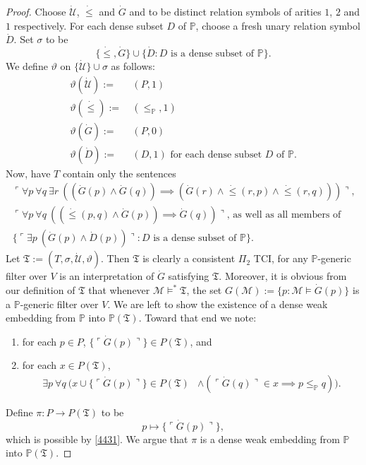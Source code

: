 \documentclass[12pt, twoside]{memoir}
\numberwithin{equation}{section}
\theoremstyle{definition}
\theoremstyle{remark}
\theoremstyle{definition}
\theoremstyle{definition}
\theoremstyle{definition}
\theoremstyle{remark}
\begin{document}
\begin{proof}
Choose $\dot{\mathcal{U}}$, $\dot{\leq}$ and $\dot{G}$ and to be distinct relation symbols of arities $1$, $2$ and $1$ respectively. For each dense subset $D$ of $\mathbb{P}$, choose a fresh unary relation symbol $\dot{D}$. Set $\sigma$ to be $$\{\dot{\leq}, \dot{G}\} \cup \{\dot{D} : D \text{ is a dense subset of } \mathbb{P}\} \text{.}$$ We define $\vartheta$ on $\{\dot{\mathcal{U}}\} \cup \sigma$ as follows:
\begin{align*}
    \vartheta(\dot{\mathcal{U}}) := \ & (P, 1) \\
    \vartheta(\dot{\leq}) := \ & (\leq_{\mathbb{P}}, 1) \\
    \vartheta(\dot{G}) := \ & (P, 0) \\
    \vartheta(\dot{D}) := \ & (D, 1) \text{ for each dense subset } D \text{ of } \mathbb{P} \text{.}
\end{align*}
Now, have $T$ contain only the sentences
\begin{gather*}
    \ulcorner \forall p \ \forall q \ \exists r \ ((\dot{G}(p) \wedge \dot{G}(q)) \implies (\dot{G}(r) \wedge \dot{\leq}(r, p) \wedge \dot{\leq}(r, q))) \urcorner \text{,} \\
    \ulcorner \forall p \ \forall q \ ((\dot{\leq}(p, q) \wedge \dot{G}(p)) \implies \dot{G}(q)) \urcorner \text{, as well as all members of} \\
    \{\ulcorner \exists p \ (\dot{G}(p) \wedge \dot{D}(p)) \urcorner : D \text{ is a dense subset of } \mathbb{P}\} \text{.}
\end{gather*} 
Let $\mathfrak{T} := (T, \sigma, \dot{\mathcal{U}}, \vartheta)$. Then $\mathfrak{T}$ is clearly a consistent $\Pi_2$ TCI, for any $\mathbb{P}$-generic filter over $V$ is an interpretation of $\dot{G}$ satisfying $\mathfrak{T}$. Moreover, it is obvious from our definition of $\mathfrak{T}$ that whenever $\mathcal{M} \models^* \mathfrak{T}$, the set $G(\mathcal{M}) := \{p : \mathcal{M} \models \dot{G}(p)\}$ is a $\mathbb{P}$-generic filter over $V$. We are left to show the existence of a dense weak embedding from $\mathbb{P}$ into $\mathbb{P}(\mathfrak{T})$. Toward that end we note:
\begin{enumerate}[label=(\arabic*)]
    \item\label{4431} for each $p \in P$, $\{\ulcorner \dot{G}(p) \urcorner\} \in P(\mathfrak{T})$, and
    \item\label{4432} for each $x \in P(\mathfrak{T})$, 
    \begin{align*}
        \exists p \ \forall q \ (x \cup \{\ulcorner \dot{G}(p) \urcorner\} \in P(\mathfrak{T}) & \wedge (\ulcorner \dot{G}(q) \urcorner \in x \implies p \leq_{\mathbb{P}} q)) \text{.}
    \end{align*}
\end{enumerate} 
Define $\pi : P \longrightarrow P(\mathfrak{T})$ to be $$p \mapsto \{\ulcorner \dot{G}(p) \urcorner\},$$ which is possible by \ref{4431}. We argue that $\pi$ is a dense weak embedding from $\mathbb{P}$ into $\mathbb{P}(\mathfrak{T})$.


\end{proof}
\end{document}

